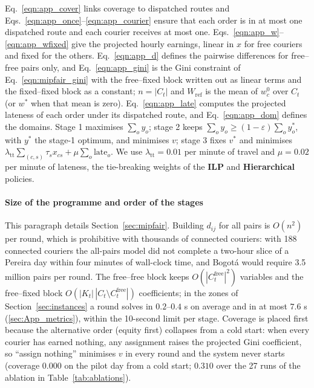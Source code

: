 \documentclass[a4paper,11pt,review,3p,authoryear]{elsarticle}
\begin{document}
Eq.~\eqref{eqn:app_cover} links coverage to dispatched routes and Eqs.~\eqref{eqn:app_once}--\eqref{eqn:app_courier} ensure that each order is in at most one dispatched route and each courier receives at most one. Eqs.~\eqref{eqn:app_w}--\eqref{eqn:app_wfixed} give the projected hourly earnings, linear in $x$ for free couriers and fixed for the others. Eq.~\eqref{eqn:app_d} defines the pairwise differences for free--free pairs only, and Eq.~\eqref{eqn:app_gini} is the Gini constraint of Eq.~\eqref{eqn:mipfair_gini} with the free--fixed block written out as linear terms and the fixed--fixed block as a constant; $n = |C_t|$ and $W_{\text{ref}}$ is the mean of $w_c^0$ over $C_t$ (or $w^*$ when that mean is zero). Eq.~\eqref{eqn:app_late} computes the projected lateness of each order under its dispatched route, and Eq.~\eqref{eqn:app_dom} defines the domains. Stage 1 maximises $\sum_o y_o$; stage 2 keeps $\sum_o y_o \ge (1 - \varepsilon) \sum_o y_o^*$, with $y^*$ the stage-1 optimum, and minimises $v$; stage 3 fixes $v^*$ and minimises $\lambda_{\text{tt}} \sum_{(c,s)} \tau_s x_{cs} + \mu \sum_o \text{late}_o$. We use $\lambda_{\text{tt}} = 0.01$ per minute of travel and $\mu = 0.02$ per minute of lateness, the tie-breaking weights of the \textbf{ILP} and \textbf{Hierarchical} policies.

\paragraph{Size of the programme and order of the stages} This paragraph details Section~\ref{sec:mipfair}. Building $d_{ij}$ for all pairs is $O(n^2)$ per round, which is prohibitive with thousands of connected couriers: with 188 connected couriers the all-pairs model did not complete a two-hour slice of a Pereira day within four minutes of wall-clock time, and Bogot\'a would require 3.5 million pairs per round. The free--free block keeps $O(|C_t^{\text{free}}|^2)$ variables and the free--fixed block $O(|K_t|\,|C_t \setminus C_t^{\text{free}}|)$ coefficients; in the zones of Section~\ref{sec:instances} a round solves in $0.2$--$0.4$ s on average and in at most $7.6$ s (\ref{sec:App_metrics}), within the 10-second limit per stage. Coverage is placed first because the alternative order (equity first) collapses from a cold start: when every courier has earned nothing, any assignment raises the projected Gini coefficient, so \enquote{assign nothing} minimises $v$ in every round and the system never starts (coverage $0.000$ on the pilot day from a cold start; $0.310$ over the 27 runs of the ablation in Table~\ref{tab:ablations}).
\end{document}
